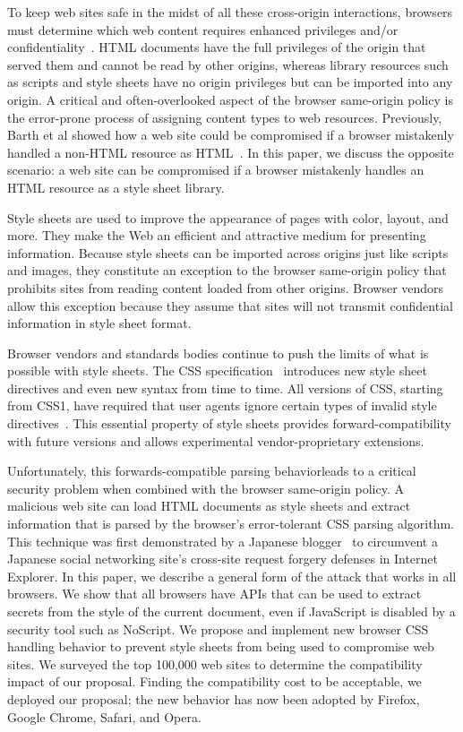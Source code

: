 \documentclass{acm_proc_article-sp}
\begin{document}
To keep web sites safe in the midst of all these cross-origin interactions,
browsers must determine which web content requires enhanced privileges and/or
confidentiality~\cite{mashupos}. HTML documents have the full privileges of
the origin that served them and cannot be read by other origins, whereas
library resources such as scripts and style sheets have no origin privileges
but can be imported into any origin. A critical and often-overlooked aspect of
the browser same-origin policy is the error-prone process of assigning content types to web resources. Previously, Barth et al showed how a web site could be
compromised if a browser mistakenly handled a non-HTML resource as
HTML~\cite{securecontentsniffing}. In this paper, we discuss the opposite
scenario: a web site can be compromised if a browser mistakenly handles an
HTML resource as a style sheet library.

Style sheets are used to improve the appearance of pages with
color, layout, and more. They make the Web an efficient and attractive medium
for presenting information. Because style sheets can be imported across
origins just like scripts and images, they constitute an exception to the
browser same-origin policy that prohibits sites from reading content loaded
from other origins. Browser vendors allow this exception because they assume
that sites will not transmit confidential information in style sheet format.

Browser vendors and standards bodies continue to push the limits of what is
possible with style sheets. The CSS specification~\cite{cssspec} introduces
new style sheet directives and even new syntax from time to time. All versions
of CSS, starting from CSS1, have required that user agents ignore certain
types of invalid style directives~\cite{syndata}. This essential property of style sheets
provides forward-compatibility with future versions and allows experimental
vendor-proprietary extensions.

Unfortunately, this forwards-compatible parsing behavior\linebreak leads to a critical
security problem when combined with the browser same-origin policy. A malicious
web site can load HTML documents as style sheets and extract information that
is parsed by the browser's error-tolerant CSS parsing algorithm. This
technique was first demonstrated by a Japanese blogger~\cite{cssxss} to
circumvent a Japanese social networking site's cross-site request forgery
defenses in Internet Explorer. In this paper, we describe a general form of
the attack that works in all browsers. We show that all browsers have APIs
that can be used to extract secrets from the style of the current document,
even if JavaScript is disabled by a security tool such as NoScript. We propose
and implement new browser CSS handling behavior to prevent style sheets from
being used to compromise web sites. We surveyed the top 100,000 web sites to
determine the compatibility impact of our proposal. Finding the compatibility
cost to be acceptable, we deployed our proposal; the new behavior has now been
adopted by Firefox, Google Chrome, Safari, and Opera.
\end{document}
